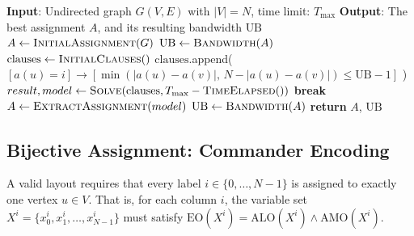\documentclass[a4paper,fleqn]{cas-sc}
\begin{document}
        \begin{algorithm}[H]
            \caption{Pseudocode of Incremental SAT for the cyclic bandwidth problem}
            \begin{algorithmic}[1]
                \State \textbf{Input}: Undirected graph $G(V,E)$ with $|V|=N$, time limit: $T_{\max}$
                \State \textbf{Output}: The best assignment $A$, and its resulting bandwidth $\text{UB}$
                \Statex
                \State $A \gets \textsc{InitialAssignment}(G)$ 
                \State $\text{UB} \gets \textsc{Bandwidth}(A)$
                \State $\text{clauses} \gets \textsc{InitialClauses}()$ 
                \Statex
                            \State $\text{clauses}$.append( $[a(u)=i] \rightarrow [\min(|a(u)-a(v)|,\, N-|a(u)-a(v)|) \le \text{UB}-1]$ )
                        \EndFor
                    \EndFor
                    \Statex
                    \State $result, model \gets \textsc{Solve}(\text{clauses}, T_{\max}-\textsc{TimeElapsed}())$
                        \State \textbf{break} 
                    \EndIf
                    \Statex
                    \State $A \gets \textsc{ExtractAssignment}(model)$
                    \State $\text{UB} \gets \textsc{Bandwidth}(A)$ 
                \EndWhile
                \Statex
                \State \textbf{return} $A$, $\text{UB}$
            \end{algorithmic}
        \end{algorithm}
    

\subsection{Bijective Assignment: Commander Encoding}
A valid layout requires that every label $i \in \{0, \dots, N-1\}$ is assigned to exactly one vertex $u \in V$. That is, for each column $i$, the variable set $X^i = \{x_0^i, x_1^i, \dots, x_{N-1}^i\}$ must satisfy $\text{EO}(X^i) = \text{ALO}(X^i) \land \text{AMO}(X^i)$.
\end{document}
